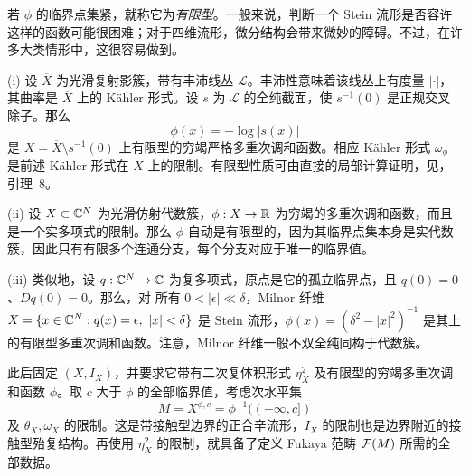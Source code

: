 若 $\phi$ 的临界点集紧，就称它为\emph{有限型}。一般来说，判断一个 Stein 流形是否容许这样的函数可能很困难；对于四维流形，微分结构会带来微妙的障碍。不过，在许多大类情形中，这很容易做到。

\begin{example}\label{st:19.3}
(i) 设 $\overline X$ 为光滑复射影簇，带有丰沛线丛 $\mathcal L$。丰沛性意味着该线丛上有度量 $|\cdot|$，其曲率是 $\overline X$ 上的 Kähler 形式。设 $s$ 为 $\mathcal L$ 的全纯截面，使 $s^{-1}(0)$ 是正规交叉除子。那么
\[
\phi(x)=-\log|s(x)|
\]
是 $X=\overline X\setminus s^{-1}(0)$ 上有限型的穷竭严格多重次调和函数。相应 Kähler 形式 $\omega_\phi$ 是前述 Kähler 形式在 $X$ 上的限制。有限型性质可由直接的局部计算证明，见，引理~8。

(ii) 设 $X\subset\mathbb C^N$ 为光滑仿射代数簇，$\phi:X\to\mathbb R$ 为穷竭的多重次调和函数，而且是一个实多项式的限制。那么 $\phi$ 自动是有限型的，因为其临界点集本身是实代数簇，因此只有有限多个连通分支，每个分支对应于唯一的临界值。

(iii) 类似地，设 $q:\mathbb C^N\to\mathbb C$ 为复多项式，原点是它的孤立临界点，且 $q(0)=0$、$Dq(0)=0$。那么，对
所有 $0<|\epsilon|\ll\delta$，Milnor 纤维 $X=\{x\in\CC^N:q(x)=\epsilon,\ |x|<\delta\}$ 是 Stein 流形，$\phi(x)=(\delta^2-|x|^2)^{-1}$ 是其上的有限型多重次调和函数。注意，Milnor 纤维一般不双全纯同构于代数簇。
\end{example}

此后固定 $(X,I_X)$，并要求它带有二次复体积形式 $\eta_X^2$ 及有限型的穷竭多重次调和函数 $\phi$。取 $c$ 大于 $\phi$ 的全部临界值，考虑次水平集
\[
M=X^{\phi,c}=\phi^{-1}(({-\infty},c])
\]
及 $\theta_X,\omega_X$ 的限制。这是带接触型边界的正合辛流形，$I_X$ 的限制也是边界附近的接触型殆复结构。再使用 $\eta_X^2$ 的限制，就具备了定义 Fukaya 范畴 $\mathcal F(M)$ 所需的全部数据。

